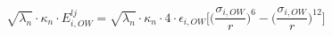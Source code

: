 \begin{center}
    \begin{equation}
        \sqrt{\lambda_n}\cdot\kappa_n\cdot E_{i,OW}^{lj} = \sqrt{\lambda_n}\cdot \kappa_n \cdot 4 \cdot\epsilon_{i,OW}\Big[ \Big( \frac{\sigma_{i,OW}}{r}\big)^6 -  \Big( \frac{\sigma_{i,OW}}{r}\big)^{12} \Big]
    \label{eq:lj_potential}
    \end{equation}
\end{center}